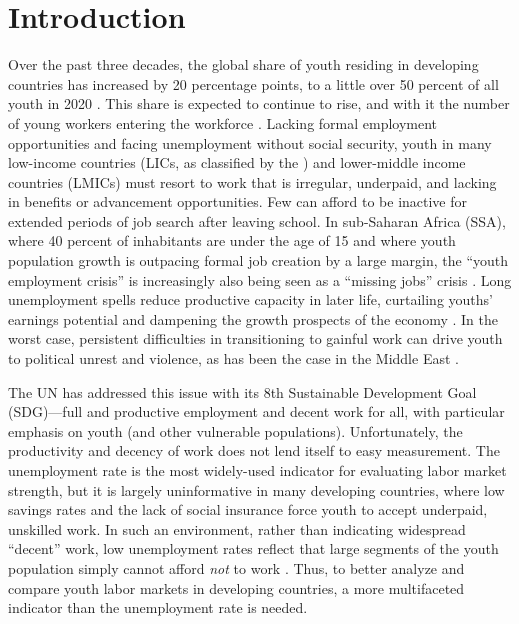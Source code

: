 \documentclass[
  a4paper, twoside, 12pt]{book}
\begin{document}
\newpage

\hypertarget{introduction}{%
\section{Introduction}\label{introduction}}

Over the past three decades, the global share of youth residing in developing countries has increased by 20 percentage points, to a little over 50 percent of all youth in 2020 \autocite{unitednationsdevelopmentprogramme2019}. This share is expected to continue to rise, and with it the number of young workers entering the workforce \autocite{roser2019}. Lacking formal employment opportunities and facing unemployment without social security, youth in many low-income countries (LICs, as classified by the \textcite{worldbank2020a}) and lower-middle income countries (LMICs) must resort to work that is irregular, underpaid, and lacking in benefits or advancement opportunities. Few can afford to be inactive for extended periods of job search after leaving school. In sub-Saharan Africa (SSA), where 40 percent of inhabitants are under the age of 15 and where youth population growth is outpacing formal job creation by a large margin, the ``youth employment crisis'' is increasingly also being seen as a ``missing jobs'' crisis \autocite{sumberg2021}. Long unemployment spells reduce productive capacity in later life, curtailing youths' earnings potential and dampening the growth prospects of the economy \autocite{gregg2005}. In the worst case, persistent difficulties in transitioning to gainful work can drive youth to political unrest and violence, as has been the case in the Middle East \autocite{urdal2006}.

The UN has addressed this issue with its 8th Sustainable Development Goal (SDG)---full and productive employment and decent work for all, with particular emphasis on youth (and other vulnerable populations). Unfortunately, the productivity and decency of work does not lend itself to easy measurement. The unemployment rate is the most widely-used indicator for evaluating labor market strength, but it is largely uninformative in many developing countries, where low savings rates and the lack of social insurance force youth to accept underpaid, unskilled work. In such an environment, rather than indicating widespread ``decent'' work, low unemployment rates reflect that large segments of the youth population simply cannot afford \emph{not} to work \autocite{zimmermann2013,dewan2007}. Thus, to better analyze and compare youth labor markets in developing countries, a more multifaceted indicator than the unemployment rate is needed.
\end{document}
